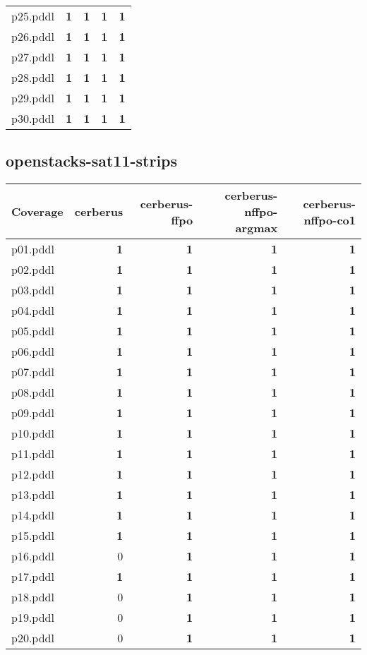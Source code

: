 \documentclass{article}
\begin{document}
\begin{tabular}{@{}lrrrr@{}}
p25.pddl & \textbf{1} & \textbf{1} & \textbf{1} & \textbf{1} \\
p26.pddl & \textbf{1} & \textbf{1} & \textbf{1} & \textbf{1} \\
p27.pddl & \textbf{1} & \textbf{1} & \textbf{1} & \textbf{1} \\
p28.pddl & \textbf{1} & \textbf{1} & \textbf{1} & \textbf{1} \\
p29.pddl & \textbf{1} & \textbf{1} & \textbf{1} & \textbf{1} \\
p30.pddl & \textbf{1} & \textbf{1} & \textbf{1} & \textbf{1} \\
\end{tabular}

\hypertarget{coverage-openstacks-sat11-strips}{}
\subsection*{openstacks-sat11-strips}

\begin{tabular}{@{}lrrrr@{}}
Coverage & cerberus & cerberus-ffpo & cerberus-nffpo-argmax & cerberus-nffpo-co1 \\
\midrule
p01.pddl & \textbf{1} & \textbf{1} & \textbf{1} & \textbf{1} \\
p02.pddl & \textbf{1} & \textbf{1} & \textbf{1} & \textbf{1} \\
p03.pddl & \textbf{1} & \textbf{1} & \textbf{1} & \textbf{1} \\
p04.pddl & \textbf{1} & \textbf{1} & \textbf{1} & \textbf{1} \\
p05.pddl & \textbf{1} & \textbf{1} & \textbf{1} & \textbf{1} \\
p06.pddl & \textbf{1} & \textbf{1} & \textbf{1} & \textbf{1} \\
p07.pddl & \textbf{1} & \textbf{1} & \textbf{1} & \textbf{1} \\
p08.pddl & \textbf{1} & \textbf{1} & \textbf{1} & \textbf{1} \\
p09.pddl & \textbf{1} & \textbf{1} & \textbf{1} & \textbf{1} \\
p10.pddl & \textbf{1} & \textbf{1} & \textbf{1} & \textbf{1} \\
p11.pddl & \textbf{1} & \textbf{1} & \textbf{1} & \textbf{1} \\
p12.pddl & \textbf{1} & \textbf{1} & \textbf{1} & \textbf{1} \\
p13.pddl & \textbf{1} & \textbf{1} & \textbf{1} & \textbf{1} \\
p14.pddl & \textbf{1} & \textbf{1} & \textbf{1} & \textbf{1} \\
p15.pddl & \textbf{1} & \textbf{1} & \textbf{1} & \textbf{1} \\
p16.pddl & 0 & \textbf{1} & \textbf{1} & \textbf{1} \\
p17.pddl & \textbf{1} & \textbf{1} & \textbf{1} & \textbf{1} \\
p18.pddl & 0 & \textbf{1} & \textbf{1} & \textbf{1} \\
p19.pddl & 0 & \textbf{1} & \textbf{1} & \textbf{1} \\
p20.pddl & 0 & \textbf{1} & \textbf{1} & \textbf{1} \\
\end{tabular}
\end{document}
